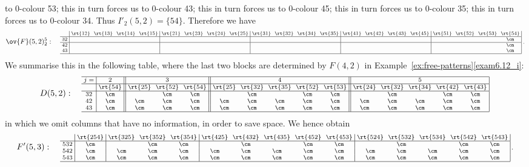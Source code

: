 \begin{exam}
to 0-colour 53; this in turn forces us to 0-colour 43; this in turn
forces us to 0-colour 45; this in turn forces us to 0-colour 35; this
in turn forces us to 0-colour 34. Thus $I'_{2}(5,2)=\{54\}$.
Therefore we have
\[ 
\ov{F}(5,2)^5_2: \quad
\text{\setlength{\arraycolsep}{2.7pt}\scriptsize
$\displaystyle 
\begin{array}{c|cccc|cccc|cccc|cccc|cccc|}
 &\rt{12}&\rt{13}&\rt{14}&\rt{15}&\rt{21} &\rt{23}&\rt{24}&\rt{25}&\rt{31}&\rt{32} &\rt{34}&\rt{35}&\rt{41}&\rt{42}&\rt{43} &\rt{45} 
 &\rt{51}&\rt{52}&\rt{53} &\rt{54} \\ \hline 
 32 	&&&&			&&&&			&& &	&&& &	&		&&&&\cm							\\ \hline
 42 	&&&&			&&&&			&& && && &	&		&&&&\cm				\\ 
 43 	&&&&			&&&&			&& && && &	&		&&&&	\cm						\\ 
 \hline
\end{array}\; .$}
\]
We summarise this in the following table, where the last two blocks
are determined by $F(4,2)$ in Example~\ref{ex:free-patterns}\ref{exam6.12_i}:
\[
D(5,2): \quad
\text{\setlength{\arraycolsep}{2.7pt}\scriptsize
$\displaystyle 
\begin{array}{c|c||ccc||ccccc||ccccc|}
\hline j=&{2}	
&\multicolumn{3}{c||}{3}
&\multicolumn{5}{c||}{4}
&\multicolumn{5}{c|}{5}					\\ \hline 
 &\rt{54}&\rt{25}&\rt{52}&\rt{54}%
 &\rt{25}&\rt{32}&\rt{35}&\rt{52}%
 &\rt{53}&\rt{24 }&\rt{32 }&\rt{34 }%
 &\rt{42}&\rt{43}\\ 
 \hline
 32 &\cm &&\cm&\cm &&\cm&&\cm&\cm &&\cm&&\cm&\cm \\ 
 42 &\cm &\cm&\cm&\cm &\cm&\cm&\cm&\cm&\cm &\cm&\cm&\cm&\cm&\cm \\
 43 &\cm &\cm&\cm&\cm &\cm&\cm&\cm&\cm&\cm &\cm&\cm&\cm&\cm&\cm \\ \hline
\end{array}\,$}
\]
in which we omit columns that have no information, in order to save space.
We hence obtain 
\[
 F' (5,3): \quad
\text{\setlength{\arraycolsep}{2.7pt}\scriptsize
$\displaystyle 
\begin{array}{c|c|ccc|ccccc|ccccc|}
 &\rt{254}&\rt{325}&\rt{352}&\rt{354}%
 &\rt{425}&\rt{432}&\rt{435}&\rt{452}%
 &\rt{453}&\rt{524}&\rt{532}&\rt{534}%
 &\rt{542}&\rt{543}\\ \hline
 532 &\cm &&\cm&\cm &&\cm&&\cm&\cm &&\cm&&\cm&\cm \\ 
 542 &\cm &\cm&\cm&\cm &\cm&\cm&\cm&\cm&\cm &\cm&\cm&\cm&\cm&\cm \\
 543 &\cm &\cm&\cm&\cm &\cm&\cm&\cm&\cm&\cm &\cm&\cm&\cm&\cm&\cm \\ \hline
\end{array}\,.$}
\] 
\end{exam}




